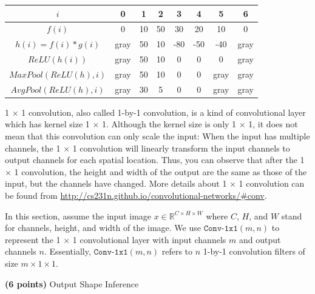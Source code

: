 \documentclass{article}
\newcommand{\R}{\mathbb{R}}
\begin{document}
\begin{probset}
\begin{prob}
    \begin{center}
        \begin{tabular}{|c|c|c|c|c|c|c|c|}
            \hline
            $i$ & 0 & 1 & 2 & 3 & 4 & 5 & 6 \\
            \hline
            $f(i)$ & 0 & 10 & 50 & 30 & 20 & 10 & 0 \\
            \hline
            $h(i) = f(i) \ast g(i)$ & gray & 50 & 10 & -80 & -50 & -40 & gray \\
            \hline
            $ReLU(h(i))$ & gray & 50 & 10 & 0 & 0 & 0 & gray \\
            \hline
            $MaxPool(ReLU(h), i)$ & gray & 50 & 10 & 0 & 0 & gray & gray \\
            \hline
            $AvgPool(ReLU(h), i)$ & gray & 30 & 5 & 0 & 0 & gray & gray \\
            \hline
        \end{tabular}
    \end{center}
\end{prob}

\newpage

\begin{prob}
    1 $\times$ 1 convolution, also called 1-by-1 convolution, is a kind of convolutional layer which has kernel size 1 $\times$ 1. Although the kernel size is only 1 $\times$ 1, it does not mean that this convolution can only scale the input: When the input has multiple channels, the 1 $\times$ 1 convolution will linearly transform the input channels to output channels for each spatial location. Thus, you can observe that after the 1 $\times$ 1 convolution, the height and width of the output are the same as those of the input, but the channels have changed. More details about 1 $\times$ 1 convolution can be found from \url{http://cs231n.github.io/convolutional-networks/#conv}.

    In this section, assume the input image $x \in \R^{C \times H \times W}$ where $C$, $H$, and $W$ stand for channels, height, and width of the image. We use $\texttt{Conv-1x1}(m, n)$ to represent the 1 $\times$ 1 convolutional layer with input channels $m$ and output channels $n$. Essentially, $\texttt{Conv-1x1}(m, n)$ refers to $n$ 1-by-1 convolution filters of size $m \times 1 \times 1$.

    \begin{subprobset}
    \begin{subprob}
        \textbf{(6 points)} Output Shape Inference


\end{subprob}
\end{subprobset}
\end{prob}
\end{probset}
\end{document}
